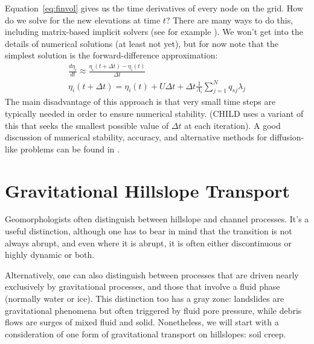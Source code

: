 \documentclass[12pt]{amsart}
\begin{document}
Equation~\ref{eq:finvol} gives us the time derivatives of every node on the grid. How do we solve for the new elevations at time $t$? There are many ways to do this, including matrix-based implicit solvers (see for example \citet{fagherazzi2002implicit}). We won't get into the details of numerical solutions (at least not yet), but for now note that the simplest solution is the forward-difference approximation:
\begin{eqnarray}
\frac{d\eta_i}{dt} \approx \frac{\eta_i(t+\Delta t) - \eta_i(t)}{\Delta t} \\
\eta_i(t+\Delta t) = \eta_i(t) + U\Delta t  + \Delta t \frac{1}{\Lambda_i} \sum_{j=1}^N q_{sj} \lambda_j
\end{eqnarray}
The main disadvantage of this approach is that very small time steps are typically needed in order to ensure numerical stability. (CHILD uses a variant of this that seeks the smallest possible value of $\Delta t$ at each iteration). A good discussion of numerical stability, accuracy, and alternative methods for diffusion-like problems can be found in \citet{press2007numerical}.


\section{Gravitational Hillslope Transport}

Geomorphologists often distinguish between hillslope and channel processes. It's a useful distinction, although one has to bear in mind that the transition is not always abrupt, and even where it is abrupt, it is often either discontinuous or highly dynamic or both.

Alternatively, one can also distinguish between processes that are driven nearly exclusively by gravitational processes, and those that involve a fluid phase (normally water or ice). This distinction too has a gray zone: landslides are gravitational phenomena but often triggered by fluid pore pressure, while debris flows are surges of mixed fluid and solid. Nonetheless, we will start with a consideration of one form of gravitational transport on hillslopes: soil creep. 
\end{document}
